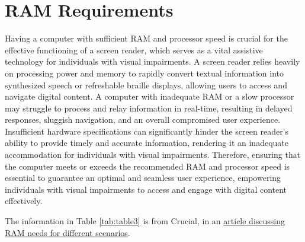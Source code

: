 \documentclass[12pt,letterpaper,twoside]{extreport}
\begin{document}
\pagebreak \hypertarget{ram-requirements}{}\section{RAM Requirements}\label{ram-requirements}
Having a computer with sufficient RAM and processor speed is crucial for the effective functioning of a screen reader, which serves as a vital assistive technology for individuals with visual impairments. A screen reader relies heavily on processing power and memory to rapidly convert textual information into synthesized speech or refreshable braille displays, allowing users to access and navigate digital content. A computer with inadequate RAM or a slow processor may struggle to process and relay information in real-time, resulting in delayed responses, sluggish navigation, and an overall compromised user experience. Insufficient hardware specifications can significantly hinder the screen reader's ability to provide timely and accurate information, rendering it an inadequate accommodation for individuals with visual impairments. Therefore, ensuring that the computer meets or exceeds the recommended RAM and processor speed is essential to guarantee an optimal and seamless user experience, empowering individuals with visual impairments to access and engage with digital content effectively.

The information in Table \ref{tab:table3} is from Crucial, in an \href{https://www.crucial.com/articles/about-memory/how-much-ram-does-my-computer-need}{article discussing RAM needs for different scenarios}.
\end{document}

